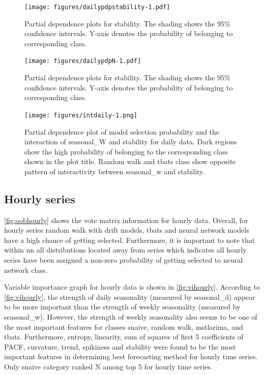 \documentclass[11pt,a4paper,]{article}
\begin{document}
\begin{figure}
\centering
\texttt{[image: figures/dailypdpstability-1.pdf]}
\caption{\label{fig:dailypdpstability}Partial dependence plots for stability. The shading shows the 95\% confidence intervals. Y-axis denotes the probability of belonging to corresponding class.}
\end{figure}

\begin{figure}
\centering
\texttt{[image: figures/dailypdpN-1.pdf]}
\caption{\label{fig:dailypdpN}Partial dependence plots for stability. The shading shows the 95\% confidence intervals. Y-axis denotes the probability of belonging to corresponding class.}
\end{figure}

\begin{figure}
\centering
\texttt{[image: figures/intdaily-1.png]}
\caption{\label{fig:intdaily}Partial dependence plot of model selection probability and the interaction of seasonal\_W and stability for daily data. Dark regions show the high probability of belonging to the corresponding class shown in the plot title. Random walk and tbats class show opposite pattern of interactivity between seasonal\_w and stability.}
\end{figure}

\hypertarget{hourly-series}{%
\subsection{Hourly series}\label{hourly-series}}

\autoref{fig:oobhourly} shows the vote matrix information for hourly data. Overall, for hourly series random walk with drift models, tbats and neural network models have a high chance of getting selected. Furthermore, it is important to note that within nn all distributions located away from series which indicates all hourly series have been assigned a non-zero probability of getting selected to neural network class.

Variable importance graph for hourly data is shown in \autoref{fig:vihourly}. According to \autoref{fig:vihourly}, the strength of daily seasonality (measured by seasonal\_d) appear to be more important than the strength of weekly seasonality (measured by seasonal\_w). However, the strength of weekly seasonality also seems to be one of the most important features for classes snaive, random walk, mstlarima, and tbats. Furthermore, entropy, linearity, sum of squares of first 5 coefficients of PACF, curvature, trend, spikiness and stability were found to be the most important features in determining best forecasting method for hourly time series. Only snaive category ranked N among top 5 for hourly time series.
\end{document}
